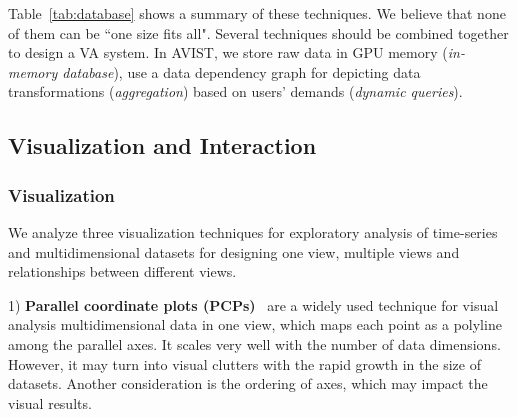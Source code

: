 Table~\ref{tab:database} shows a summary of these techniques.
We believe that none of them can be ``one size fits all". Several techniques should be combined together to design a VA system. In AVIST, we store raw data in GPU memory (\textit{in-memory database}), use a data dependency graph for depicting data transformations (\textit{aggregation}) based on users' demands (\textit{dynamic queries}).







\subsection{Visualization and Interaction}


\subsubsection{Visualization}
We analyze three visualization techniques for exploratory analysis of time-series and multidimensional datasets for designing one view, multiple views and relationships between different views.

1) \textbf{Parallel coordinate plots (PCPs)}~\cite{Inselberg} are a widely used technique for visual analysis  multidimensional data in one view,  which maps each point as a polyline among the parallel axes. 
It scales very well with the number of data dimensions. 
However, it may turn into visual clutters with the rapid growth in the size of datasets. Another consideration is the ordering of axes, which may impact the visual results.




